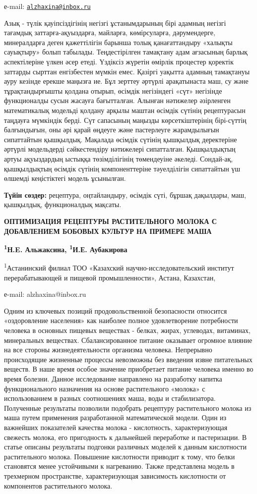 е-mail: \href{mailto:alzhaxina@inbox.ru}{\nolinkurl{alzhaxina@inbox.ru}}

Азық - түлік қауіпсіздігінің негізгі ұстанымдарының бірі адамның негізгі
тағамдық заттарға-ақуыздарға, майларға, көмірсуларға, дәрумендерге,
минералдарға деген қажеттілігін барынша толық қанағаттандыру «халықты
сауықтыру» болып табылады. Теңдестірілген тамақтану адам ағзасының
барлық аспектілеріне үлкен әсер етеді. Үздіксіз жүретін өмірлік
процестер қоректік заттарды сырттан енгізбестен мүмкін емес. Қазіргі
уақытта адамның тамақтануы ауру кезінде ерекше маңызға ие. Бұл зерттеу
әртүрлі арақатынаста маш, су және тұрақтандырғышты қолдана отырып,
өсімдік негізіндегі «сүт» негізінде функционалды сусын жасауға
бағытталған. Алынған нәтижелер әзірленген математикалық модельді қолдану
арқылы маштан өсімдік сүтінің рецептурасын таңдауға мүмкіндік берді. Сүт
сапасының маңызды көрсеткіштерінің бірі-сүттің балғындығын, оны әрі
қарай өңдеуге және пастерлеуге жарамдылығын сипаттайтын қышқылдық.
Мақалада өсімдік сүтінің қышқылдық деректеріне әртүрлі модельдерді
сәйкестендіру нәтижелері сипатталған. Қышқылдықтың артуы ақуыздардың
ыстыққа төзімділігінің төмендеуіне әкеледі. Сондай-ақ, қышқылдықтың
өсімдік сүтінің компоненттеріне тәуелділігін сипаттайтын үш өлшемді
кеңістіктегі модель ұсынылған.

{\bfseries Түйін сөздер:} рецептура, оңтайландыру, өсімдік сүті, бұршақ
дақылдары, маш, қышқылдық, функционалдық мақсаты.

{\bfseries ОПТИМИЗАЦИЯ РЕЦЕПТУРЫ РАСТИТЕЛЬНОГО МОЛОКА С ДОБАВЛЕНИЕМ БОБОВЫХ
КУЛЬТУР НА ПРИМЕРЕ МАША}

{\bfseries \textsuperscript{1}Н.E. Альжаксина, \textsuperscript{1}И.Е.
Аубакирова}

\textsuperscript{1}Астанинский филиал ТОО «Казахский
научно-исследовательский институт перерабатывающей и пищевой
промышленности», Астана, Казахстан,

е-mail: alzhaxina@inbox.ru

Одним из ключевых позиций продовольственной безопасности относится
«оздоровление населения» как наиболее полное удовлетворение потребности
человека в основных пищевых веществах - белках, жирах, углеводах,
витаминах, минеральных веществах. Сбалансированное питание оказывает
огромное влияние на все стороны жизнедеятельности организма человека.
Непрерывно происходящие жизненные процессы невозможны без введения извне
питательных веществ. В наше время особое значение приобретает питание
человека именно во время болезни. Данное исследование направлено на
разработку напитка функционального назначения на основе растительного
«молока» с использованием в разных соотношениях маша, воды и
стабилизатора. Полученные результаты позволили подобрать рецептуру
растительного молока из маша путем применения разработанной
математической модели. Один из важнейших показателей качества молока -
кислотность, характеризующая свежесть молока, его пригодность к
дальнейшей переработке и пастеризации. В статье описаны результаты
подгонки различных моделей к данным кислотности растительного молока.
Повышение кислотности приводит к тому, что белки становятся менее
устойчивыми к нагреванию. Также представлена модель в трехмерном
пространстве, характеризующая зависимость кислотности от компонентов
растительного молока.


